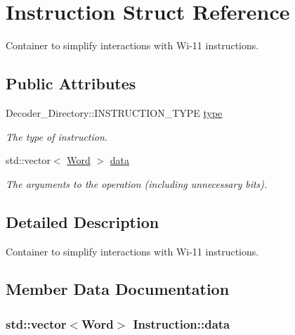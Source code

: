 \hypertarget{structInstruction}{
\section{Instruction Struct Reference}
\label{structInstruction}
}


Container to simplify interactions with Wi-\/11 instructions.  


\subsection*{Public Attributes}
\begin{DoxyCompactItemize}
\item 
\hypertarget{structInstruction_a2f5e91a25d72c7ec993a1cb472602d95}{
Decoder\_\-Directory::INSTRUCTION\_\-TYPE \hyperlink{structInstruction_a2f5e91a25d72c7ec993a1cb472602d95}{type}}
\label{structInstruction_a2f5e91a25d72c7ec993a1cb472602d95}

\begin{DoxyCompactList}\small\item\em The type of instruction. \item\end{DoxyCompactList}\item 
std::vector$<$ \hyperlink{classWord}{Word} $>$ \hyperlink{structInstruction_a93f6b7366b14b17d8379ea952687960c}{data}
\begin{DoxyCompactList}\small\item\em The arguments to the operation (including unnecessary bits). \item\end{DoxyCompactList}\end{DoxyCompactItemize}


\subsection{Detailed Description}
Container to simplify interactions with Wi-\/11 instructions. 

\subsection{Member Data Documentation}
\hypertarget{structInstruction_a93f6b7366b14b17d8379ea952687960c}{
\subsubsection[{data}]{\setlength{\rightskip}{0pt plus 5cm}std::vector$<${\bf Word}$>$ {\bf Instruction::data}}}
\label{structInstruction_a93f6b7366b14b17d8379ea952687960c}


